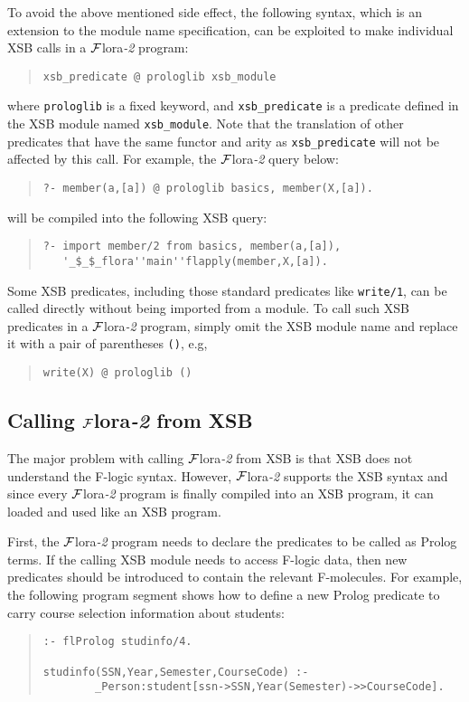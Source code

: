 \documentclass[11pt]{article}
\newcommand{\FLORA}{{\mbox{${\cal F}${\sc lora}\rm\emph{-2}}}\xspace}
\newcommand{\fl}{\mbox{F-logic}\xspace}
\begin{document}
%
To avoid the above mentioned side effect, the following syntax, which
is an extension to the module name specification, can be exploited to
make individual XSB calls in a \FLORA program:
\begin{quote}
\begin{verbatim}
xsb_predicate @ prologlib xsb_module
\end{verbatim}
\end{quote}
where {\tt prologlib} is a fixed keyword, and \verb|xsb_predicate| is a
predicate defined in the XSB module named \verb|xsb_module|. Note that
the translation of other predicates that have the same functor and
arity as \verb|xsb_predicate| will not be affected by this call. For
example, the \FLORA query below:
\begin{quote}
\verb|?- member(a,[a]) @ prologlib basics, member(X,[a]).|
\end{quote}
will be compiled into the following XSB query:
\begin{quote}
\begin{verbatim}
?- import member/2 from basics, member(a,[a]),
   '_$_$_flora''main''flapply(member,X,[a]).
\end{verbatim}
\end{quote}

Some XSB predicates, including those standard predicates like
{\tt write/1}, can be called directly without being imported from a
module. To call such XSB predicates in a \FLORA program, simply omit
the XSB module name and replace it with a pair of parentheses {\tt ()},
e.g,
\begin{quote}
\verb|write(X) @ prologlib ()|
\end{quote}


\subsection{Calling \FLORA from XSB}

\index{module!calling \FLORA}
%
The major problem with calling \FLORA from XSB is that XSB does not
understand the \fl syntax. However, \FLORA supports the XSB syntax and
since every \FLORA program is finally compiled into an XSB program, it
can loaded and used like an XSB program.

First, the \FLORA program needs to declare the predicates to be called
as Prolog terms. If the calling XSB module needs to access \fl data,
then new predicates should be introduced to contain the relevant
F-molecules.  For example, the following program segment shows how to
define a new Prolog predicate to carry course selection information
about students:
\begin{quote}
\begin{verbatim}
:- flProlog studinfo/4.

studinfo(SSN,Year,Semester,CourseCode) :-
        _Person:student[ssn->SSN,Year(Semester)->>CourseCode].
\end{verbatim}
\end{quote}
\end{document}
